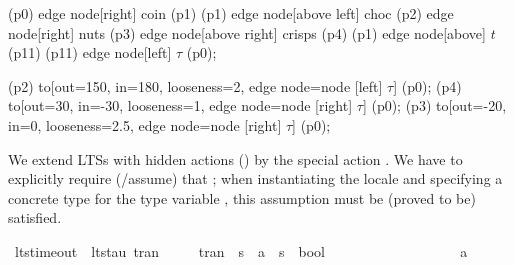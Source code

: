 \begin{isabellebody}
\begin{isamarkuptext}
{    \path   (p0) edge node[right] {coin} (p1)
            (p1) edge node[above left] {choc} (p2)
                 edge node[right] {nuts} (p3)
                 edge node[above right] {crisps} (p4)
            (p1) edge node[above] {$t$} (p11)
            (p11) edge node[left] {$\tau$} (p0);
                 
    \draw (p2) to[out=150, in=180, looseness=2, edge node={node [left] {$\tau$}}] (p0);
    \draw (p4) to[out=30, in=-30, looseness=1, edge node={node [right] {$\tau$}}] (p0);
    \draw (p3) to[out=-20, in=0, looseness=2.5, edge node={node [right] {$\tau$}}] (p0);
}%
\end{isamarkuptext}\isamarkuptrue%
%
\isadelimdocument
%
\endisadelimdocument
%
\isatagdocument
%
\isamarkuptrue%
%
\endisatagdocument
{\isafolddocument}%
%
\isadelimdocument
%
\endisadelimdocument
%
\begin{isamarkuptext}%
We extend LTSs with hidden actions () by the special action . We have to explicitly require (/assume) that ; when instantiating the locale  and specifying a concrete type for the type variable , this assumption must be (proved to be) satisfied.
\pagebreak%
\end{isamarkuptext}\isamarkuptrue%
\isamarkupfalse%
\ lts{\isacharunderscore}{\kern0pt}timeout\ {\isacharequal}{\kern0pt}\ lts{\isacharunderscore}{\kern0pt}tau\ tran\ {\isasymtau}\ \isanewline
\ \ \ tran\ {\isacharcolon}{\kern0pt}{\isacharcolon}{\kern0pt}\ {\isachardoublequoteopen}{\isacharprime}{\kern0pt}s\ {\isasymRightarrow}\ {\isacharprime}{\kern0pt}a\ {\isasymRightarrow}\ {\isacharprime}{\kern0pt}s\ {\isasymRightarrow}\ bool{\isachardoublequoteclose}\ \isanewline
\ \ \ \ {\isacharparenleft}{\kern0pt}{\isachardoublequoteopen}{\isacharunderscore}{\kern0pt}\ {\isasymlongmapsto}{\isacharunderscore}{\kern0pt}\ {\isacharunderscore}{\kern0pt}{\isachardoublequoteclose}\ {\isacharbrackleft}{\kern0pt}{}{}{\isacharcomma}{\kern0pt}\ {}{}{\isacharcomma}{\kern0pt}\ {}{}{\isacharbrackright}{\kern0pt}\ {}{}{\isacharparenright}{\kern0pt}\isanewline
\ \ \ \ \ {\isasymtau}\ {\isacharcolon}{\kern0pt}{\isacharcolon}{\kern0pt}\ {\isachardoublequoteopen}{\isacharprime}{\kern0pt}a{\isachardoublequoteclose}\ {\isacharplus}{\kern0pt}\isanewline

\end{isabellebody}
